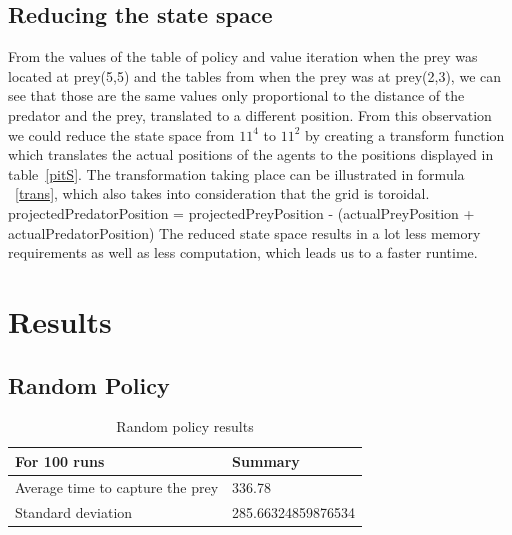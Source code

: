 \documentclass[paper=a4, fontsize=11pt]{scrartcl}
\numberwithin{equation}{section}		%
\numberwithin{figure}{section}			%
\numberwithin{table}{section}				%
\begin{document}
\subsection{Reducing the state space}
\label{reduce}
From the values of the table of policy and value iteration when the prey was located at prey(5,5) and the tables from when the prey was at prey(2,3), we can see that those are the same values only proportional to the distance of the predator and the prey, translated to a different position. From this observation we could reduce the state space from $11^4$  to $11^2$ by creating a transform function which translates the actual positions of the agents to the positions displayed in table~\ref{pitS}. The transformation taking place can be illustrated in formula ~\ref{trans}, which also takes into consideration that the grid is toroidal.
projectedPredatorPosition = projectedPreyPosition - (actualPreyPosition + actualPredatorPosition)
The reduced state space results in a lot less memory requirements as well as less computation, which leads us to a faster runtime. 


\section{Results}
\label{results}

\subsection{Random Policy}
\begin{table}[H]
\caption{Random policy results}
\centering
    \begin{tabular}{| l || l |}
    \hline
     For 100 runs & Summary \\ \hline
    Average time to capture the prey & 336.78\\ \hline
    Standard deviation & 285.66324859876534 \\
    \hline
    \end{tabular}
\end{table}
\end{document}
